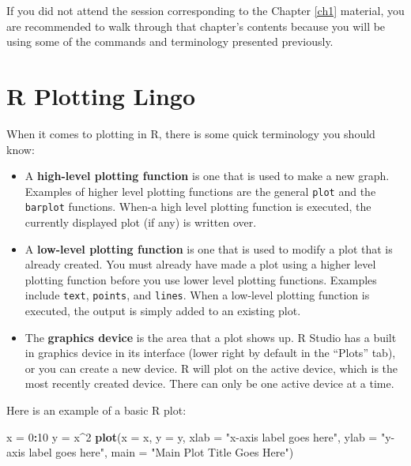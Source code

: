 \documentclass[]{book}
\newenvironment{Shaded}{\begin{snugshade}}{\end{snugshade}}
\newcommand{\KeywordTok}[1]{\textcolor[rgb]{0.13,0.29,0.53}{\textbf{#1}}}
\newcommand{\DataTypeTok}[1]{\textcolor[rgb]{0.13,0.29,0.53}{#1}}
\newcommand{\DecValTok}[1]{\textcolor[rgb]{0.00,0.00,0.81}{#1}}
\newcommand{\StringTok}[1]{\textcolor[rgb]{0.31,0.60,0.02}{#1}}
\newcommand{\OperatorTok}[1]{\textcolor[rgb]{0.81,0.36,0.00}{\textbf{#1}}}
\newcommand{\NormalTok}[1]{#1}
\theoremstyle{definition}
\theoremstyle{definition}
\theoremstyle{definition}
\theoremstyle{remark}
\begin{document}
If you did not attend the session corresponding to the Chapter \ref{ch1}
material, you are recommended to walk through that chapter's contents
because you will be using some of the commands and terminology presented
previously.

\section{R Plotting Lingo}\label{r-plotting-lingo}

When it comes to plotting in R, there is some quick terminology you
should know:

\begin{itemize}
\item
  A \textbf{high-level plotting function} is one that is used to make a
  new graph. Examples of higher level plotting functions are the general
  \texttt{plot} and the \texttt{barplot} functions. When-a high level
  plotting function is executed, the currently displayed plot (if any)
  is written over.
\item
  A \textbf{low-level plotting function} is one that is used to modify a
  plot that is already created. You must already have made a plot using
  a higher level plotting function before you use lower level plotting
  functions. Examples include \texttt{text}, \texttt{points}, and
  \texttt{lines}. When a low-level plotting function is executed, the
  output is simply added to an existing plot.
\item
  The \textbf{graphics device} is the area that a plot shows up. R
  Studio has a built in graphics device in its interface (lower right by
  default in the ``Plots'' tab), or you can create a new device. R will
  plot on the active device, which is the most recently created device.
  There can only be one active device at a time.
\end{itemize}

Here is an example of a basic R plot:

\begin{Shaded}
\begin{Highlighting}[]
\NormalTok{x =}\StringTok{ }\DecValTok{0}\OperatorTok{:}\DecValTok{10}
\NormalTok{y =}\StringTok{ }\NormalTok{x}\OperatorTok{^}\DecValTok{2}
\KeywordTok{plot}\NormalTok{(}\DataTypeTok{x =}\NormalTok{ x, }\DataTypeTok{y =}\NormalTok{ y,}
     \DataTypeTok{xlab =} \StringTok{"x-axis label goes here"}\NormalTok{,}
     \DataTypeTok{ylab =} \StringTok{"y-axis label goes here"}\NormalTok{,}
     \DataTypeTok{main =} \StringTok{"Main Plot Title Goes Here"}\NormalTok{)}
\end{Highlighting}
\end{Shaded}
\end{document}
